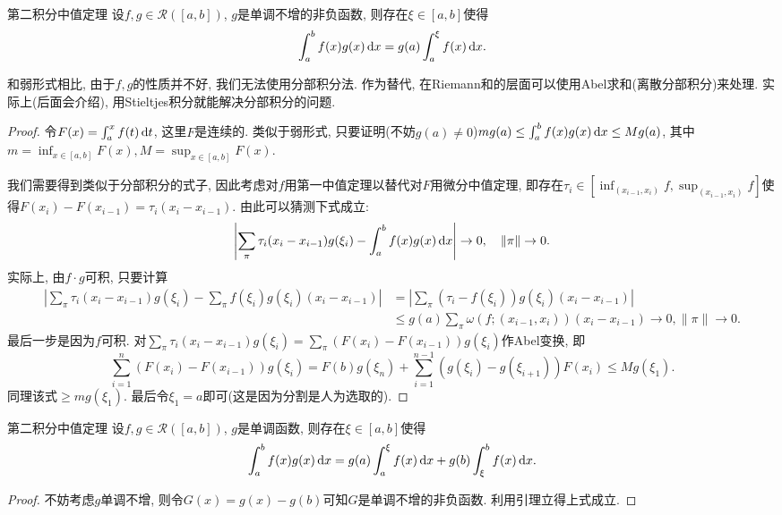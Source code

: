 \begin{lemma}{第二积分中值定理}
	设$f,g \in \mathcal{R}([a,b])$, $g$是单调不增的非负函数, 则存在$\xi \in [a,b]$使得$$\int_a^b f(x) g(x) \mathop{}\!\mathrm{d} x = g(a) \int_a^{\xi} f(x) \mathop{}\!\mathrm{d} x.$$
\end{lemma}
\begin{remark}
	和弱形式相比, 由于$f,g$的性质并不好, 我们无法使用分部积分法. 作为替代, 在Riemann和的层面可以使用Abel求和(离散分部积分)来处理. 实际上(后面会介绍), 用Stieltjes积分就能解决分部积分的问题. 
\end{remark}
\begin{proof}
	令$F(x)=\int_a^x f(t)\mathop{}\!\mathrm{d} t$, 这里$F$是连续的. 类似于弱形式, 只要证明(不妨$g(a) \neq 0$)$mg(a) \leq \int_a^b f(x)g(x) \mathop{}\!\mathrm{d} x \leq Mg(a)$, 其中$m=\inf_{x \in [a,b]}F(x), M=\sup_{x \in [a,b]}F(x)$. 
	
	我们需要得到类似于分部积分的式子, 因此考虑对$f$用第一中值定理以替代对$F$用微分中值定理, 即存在$\tau _i \in [\inf_{(x_{i-1},x_i)}f,\sup_{(x_{i-1},x_i)}f]$使得$F(x_i)-F(x_{i-1}) = \tau _i (x_i-x_{i-1})$. 由此可以猜测下式成立: $$\left| \sum_{\pi} \tau _i (x_i-x_{i-1}) g(\xi _i) - \int_a^b f(x)g(x) \mathop{}\!\mathrm{d} x \right| \to 0,\quad \| \pi \| \to 0.$$
	实际上, 由$f\cdot g$可积, 只要计算
	\begin{align*}
		\left| \sum_{\pi} \tau _i (x_i-x_{i-1}) g(\xi _i) - \sum_{\pi} f(\xi _i)g(\xi _i)(x_i-x_{i-1}) \right| &= \left| \sum_{\pi} (\tau _i-f(\xi _i))g(\xi _i)(x_i-x_{i-1})  \right| \\
		&\leq  g(a) \sum_{\pi} \omega (f;(x_{i-1},x_i))(x_i-x_{i-1})  \to 0, \| \pi \| \to 0.
	\end{align*}
	最后一步是因为$f$可积. 对$\sum_{\pi} \tau _i (x_i-x_{i-1}) g(\xi _i) = \sum_{\pi} (F(x_i)-F(x_{i-1})) g(\xi _i)$作Abel变换, 即$$\sum_{i=1}^n (F(x_i)-F(x_{i-1})) g(\xi _i) = F(b)g(\xi _n) + \sum_{i=1}^{n-1} (g(\xi _i)-g(\xi _{i+1})) F(x_i) \leq Mg(\xi _1).$$
	同理该式$\geq mg(\xi _1)$. 最后令$\xi _1=a$即可(这是因为分割是人为选取的). 
\end{proof}



\begin{theorem}{第二积分中值定理}
	设$f,g \in \mathcal{R}([a,b])$, $g$是单调函数, 则存在$\xi \in [a,b]$使得$$\int_a^b f(x) g(x) \mathop{}\!\mathrm{d} x = g(a) \int_a^{\xi} f(x) \mathop{}\!\mathrm{d} x + g(b) \int_{\xi}^{b} f(x) \mathop{}\!\mathrm{d} x.$$
\end{theorem}
\begin{proof}
	不妨考虑$g$单调不增, 则令$G(x)=g(x)-g(b)$可知$G$是单调不增的非负函数. 利用引理立得上式成立. 
\end{proof}

